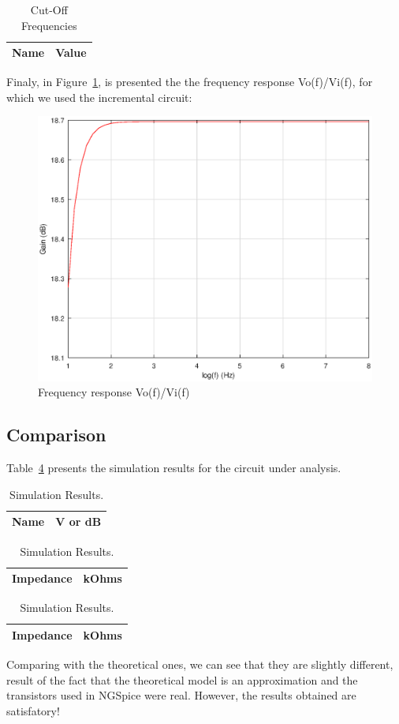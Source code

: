 \begin{table}[H]
  \centering
  \begin{tabular}{|l|r|}
     \hline    
    {\bf Name} & {\bf Value} \\ \hline   
    
  \end{tabular}
  \caption{Cut-Off Frequencies}
  \label{tab:lc}
\end{table}

Finaly, in Figure~\ref{fig:gainoct}, is presented the the frequency response Vo(f)/Vi(f), for which we used the incremental circuit:

\begin{figure}[H] \centering
\includegraphics[width=0.4\linewidth]{Gain.eps}
\caption{Frequency response Vo(f)/Vi(f)}
\label{fig:gainoct}
\end{figure}

\subsection{Comparison}

Table~\ref{tab10:sim} presents the simulation results for the circuit under analysis.

\begin{table}[H]
  \centering
  \begin{tabular}{|l|r|}
    \hline    
    {\bf Name} & {\bf V or dB} \\ \hline
    
  \end{tabular}
  \begin{tabular}{|l|c|}
    \hline
    {\bf Impedance} & {\bf kOhms} \\ \hline
    
  \end{tabular}
  \begin{tabular}{|l|c|}
    \hline
    {\bf Impedance} & {\bf kOhms} \\ \hline
    
  \end{tabular}
    \caption{Simulation Results.}
    \label{tab10:sim}
\end{table}

Comparing with the theoretical ones, we can see that they are slightly different, result of the fact that the theoretical model is an approximation and the transistors used in NGSpice were real. However, the results obtained are satisfatory!
